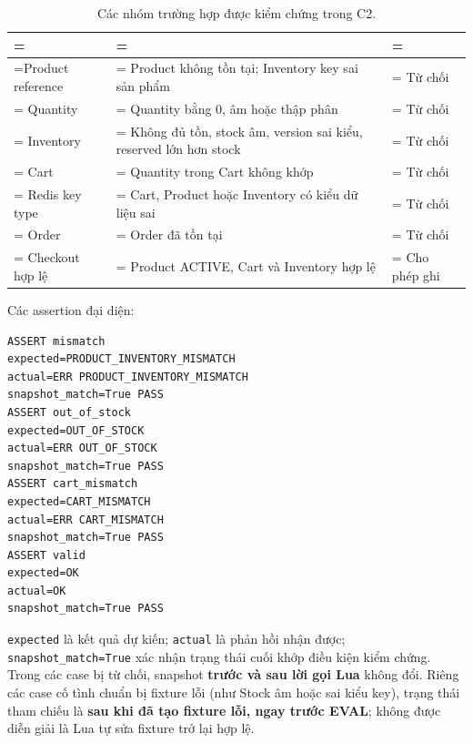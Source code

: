 \begin{table}[H]
\centering
\caption{Các nhóm trường hợp được kiểm chứng trong C2.}\label{tab:tx-5}
\reporttablesetup
\footnotesize
\begin{tabularx}{\linewidth}{|>{\hsize\linewidth=\hsize}L|>{\hsize\linewidth=\hsize}L|>{\hsize\linewidth=\hsize}L|}
\hline
{}
 &  &  \\ \hline
Product reference & Product không tồn tại; Inventory key sai sản phẩm & Từ chối \\ \hline
Quantity & Quantity bằng 0, âm hoặc thập phân & Từ chối \\ \hline
Inventory & Không đủ tồn, stock âm, version sai kiểu, reserved lớn hơn stock & Từ chối \\ \hline
Cart & Quantity trong Cart không khớp & Từ chối \\ \hline
Redis key type & Cart, Product hoặc Inventory có kiểu dữ liệu sai & Từ chối \\ \hline
Order & Order đã tồn tại & Từ chối \\ \hline
Checkout hợp lệ & Product ACTIVE, Cart và Inventory hợp lệ & Cho phép ghi \\ \hline
\end{tabularx}
\end{table}
Các assertion đại diện:

\begingroup
{}\label{result:tx-7}
\nopagebreak[4]
\begin{Verbatim}
ASSERT mismatch
expected=PRODUCT_INVENTORY_MISMATCH
actual=ERR PRODUCT_INVENTORY_MISMATCH
snapshot_match=True PASS
ASSERT out_of_stock
expected=OUT_OF_STOCK
actual=ERR OUT_OF_STOCK
snapshot_match=True PASS
ASSERT cart_mismatch
expected=CART_MISMATCH
actual=ERR CART_MISMATCH
snapshot_match=True PASS
ASSERT valid
expected=OK
actual=OK
snapshot_match=True PASS
\end{Verbatim}
\endgroup\par\smallskip
\texttt{expected} là kết quả dự kiến; \texttt{actual} là phản hồi nhận được; \texttt{snapshot\_\allowbreak{}match=\allowbreak{}True} xác nhận trạng thái cuối khớp điều kiện kiểm chứng. Trong các case bị từ chối, snapshot \textbf{trước và sau lời gọi Lua} không đổi. Riêng các case cố tình chuẩn bị fixture lỗi (như Stock âm hoặc sai kiểu key), trạng thái tham chiếu là \textbf{sau khi đã tạo fixture lỗi, ngay trước EVAL}; không được diễn giải là Lua tự sửa fixture trở lại hợp lệ.

